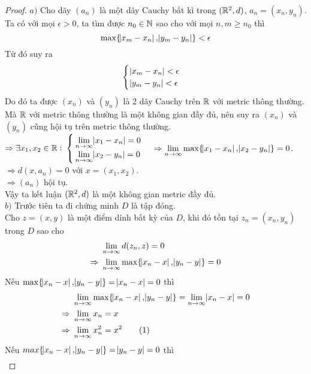 \begin{proof}
    $a)$ Cho dãy $(a_{n})$ là một dãy Cauchy bất kì trong $(\mathbb R^2,d)$, $a_{n} = (x_n, y_n)$.\\
    Ta có với mọi $\epsilon > 0$, ta tìm được $n_0 \in \mathbb N$ sao cho với mọi $n,m \geq n_0$ thì
    $$
        \max\{\abs{x_m - x_n}, \abs{y_m - y_n}\} < \epsilon
    $$
    Từ đó suy ra
    $$
        \begin{cases}
            \abs{x_m - x_n} < \epsilon\\
            \abs{y_m - y_n} < \epsilon
        \end{cases}
    $$
    Do đó ta được $(x_n)$ và $(y_n)$ là 2 dãy Cauchy trên $\mathbb R$ với metric thông thường. Mà $\mathbb R$ với metric thông thường là một không gian đầy đủ, nên suy ra $(x_n)$ và $(y_n)$ cũng hội tụ trên metric thông thường.\\
    $\Rightarrow \exists x_1, x_2 \in \mathbb R:$
    $\begin{cases}
        \displaystyle\lim_{n\to\infty} \abs{x_1 - x_n} = 0\\
        \displaystyle\lim_{n\to\infty} \abs{x_2 - y_n} = 0
    \end{cases}$\nl
    $\Rightarrow \displaystyle\lim_{n\to\infty} \max\{ \abs{x_1 - x_n}, \abs{x_2 - y_n} \} = 0$.\nl
    $\Rightarrow d(x,a_n) = 0$ với $x = (x_1, x_2)$.\\
    $\Rightarrow (a_n)$ hội tụ.\\
    Vậy ta kết luận $(\mathbb R^2, d)$ là một không gian metric đầy đủ.\\[3mm]
    $b)$ Trước tiên ta đi chứng minh $D$ là tập đóng.\\
    Cho $z=(x,y)$ là một điểm dính bất kỳ của $D$, khi đó tồn tại $z_n=(x_n,y_n)$ trong $D$ sao cho
    \begin{align*}
        &\ \lim_{n\to\infty} d(z_n,z) = 0\\
        \Rightarrow&\ \lim_{n\to\infty} \max\{\abs{x_n - x},\abs{y_n - y}\} = 0
    \end{align*}
    Nếu $\max\{\abs{x_n - x}, \abs{y_n - y}\} = \abs{x_n - x} = 0$ thì
    \begin{align*}
        &\ \lim_{n\to\infty} \max\{\abs{x_n - x}, \abs{y_n - y}\} = \lim_{n\to\infty} \abs{x_n - x} = 0\\
        \Rightarrow&\ \lim_{n\to\infty} x_n = x\\
        \Rightarrow&\ \lim_{n\to\infty} x_n^2 = x^2 \tag{1}
    \end{align*}
    Nếu $max\{\abs{x_n - x},\abs{y_n - y}\} = \abs{y_n - y} = 0$ thì
    \begin{align*}    

\end{align*}
\end{proof}
